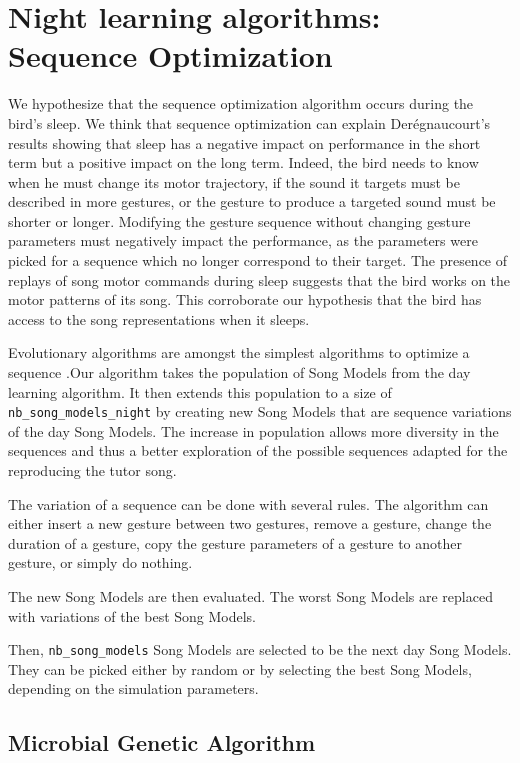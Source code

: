 \documentclass{report}
\begin{document}
\section{Night learning algorithms: Sequence Optimization}
\label{night-learning-algorithms}

We hypothesize that the sequence optimization algorithm occurs during the bird's
sleep. We think that sequence optimization can explain Derégnaucourt's results
showing that sleep has a negative impact on performance in the short term but a
positive impact on the long term. Indeed, the bird needs to know when he must
change its motor trajectory, if the sound it targets must be described in more
gestures, or the gesture to produce a targeted sound must be shorter or longer.
Modifying the gesture sequence without changing gesture parameters must
negatively impact the performance, as the parameters were picked for a sequence
which no longer correspond to their target. The presence of replays of song
motor commands during sleep suggests that the bird works on the motor patterns
of its song. This corroborate our hypothesis that the bird has access to the
song representations when it sleeps.

Evolutionary algorithms are amongst the simplest algorithms to optimize a
sequence \parencite{eiben_introduction_2003}.Our
algorithm takes the population of Song Models from the day learning algorithm.
It then extends this population to a size of \texttt{nb\_song\_models\_night} by
creating new Song Models that are sequence variations of the day Song Models.
The increase in population allows more diversity in the sequences and thus a
better exploration of the possible sequences adapted for the reproducing the
tutor song.

The variation of a sequence can be done with several rules. The algorithm can
either insert a new gesture between two gestures, remove a gesture, change the
duration of a gesture, copy the gesture parameters of a gesture to another
gesture, or simply do nothing.

The new Song Models are then evaluated. The worst Song Models are replaced with
variations of the best Song Models.

Then, \texttt{nb\_song\_models} Song Models are selected to be the next day
Song Models. They can be picked either by random or by selecting the best Song
Models, depending on the simulation parameters.

\subsection{Microbial Genetic Algorithm}
\label{mga}
\end{document}

